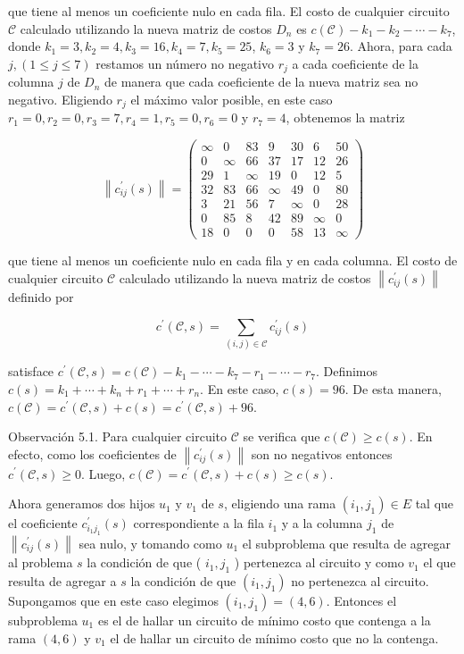 \documentclass[10pt]{article}
\begin{document}
que tiene al menos un coeficiente nulo en cada fila. El costo de cualquier circuito $\mathcal{C}$ calculado utilizando la nueva matriz de costos $D_{n}$ es $c(\mathcal{C})-k_{1}-k_{2}-\cdots-k_{7}$, donde $k_{1}=3, k_{2}=4, k_{3}=16, k_{4}=7, k_{5}=25$, $k_{6}=3$ y $k_{7}=26$. Ahora, para cada $j,(1 \leq j \leq 7)$ restamos un número no negativo $r_{j}$ a cada coeficiente de la columna $j$ de $D_{n}$ de manera que cada coeficiente de la nueva matriz sea no negativo. Eligiendo $r_{j}$ el máximo valor posible, en este caso $r_{1}=0, r_{2}=0, r_{3}=7, r_{4}=1, r_{5}=0, r_{6}=0$ y $r_{7}=4$, obtenemos la matriz

$$
\left\|c_{i j}^{\prime}(s)\right\|=\left(\begin{array}{ccccccc}
\infty & 0 & 83 & 9 & 30 & 6 & 50 \\
0 & \infty & 66 & 37 & 17 & 12 & 26 \\
29 & 1 & \infty & 19 & 0 & 12 & 5 \\
32 & 83 & 66 & \infty & 49 & 0 & 80 \\
3 & 21 & 56 & 7 & \infty & 0 & 28 \\
0 & 85 & 8 & 42 & 89 & \infty & 0 \\
18 & 0 & 0 & 0 & 58 & 13 & \infty
\end{array}\right)
$$

que tiene al menos un coeficiente nulo en cada fila y en cada columna. El costo de cualquier circuito $\mathcal{C}$ calculado utilizando la nueva matriz de costos $\left\|c_{i j}^{\prime}(s)\right\|$ definido por

$$
c^{\prime}(\mathcal{C}, s)=\sum_{(i, j) \in \mathcal{C}} c_{i j}^{\prime}(s)
$$

satisface $c^{\prime}(\mathcal{C}, s)=c(\mathcal{C})-k_{1}-\cdots-k_{7}-r_{1}-\cdots-r_{7}$. Definimos $c(s)=k_{1}+\cdots+k_{n}+r_{1}+\cdots+r_{n}$. En este caso, $c(s)=96$. De esta manera, $c(\mathcal{C})=c^{\prime}(\mathcal{C}, s)+c(s)=c^{\prime}(\mathcal{C}, s)+96$.

Observación 5.1. Para cualquier circuito $\mathcal{C}$ se verifica que $c(\mathcal{C}) \geq c(s)$. En efecto, como los coeficientes de $\left\|c_{i j}^{\prime}(s)\right\|$ son no negativos entonces $c^{\prime}(\mathcal{C}, s) \geq 0$. Luego, $c(\mathcal{C})=c^{\prime}(\mathcal{C}, s)+c(s) \geq c(s)$.

Ahora generamos dos hijos $u_{1}$ y $v_{1}$ de $s$, eligiendo una rama $\left(i_{1}, j_{1}\right) \in E$ tal que el coeficiente $c_{i_{1} j_{1}}^{\prime}(s)$ correspondiente a la fila $i_{1}$ y a la columna $j_{1}$ de $\left\|c_{i j}^{\prime}(s)\right\|$ sea nulo, y tomando como $u_{1}$ el subproblema que resulta de agregar al problema $s$ la condición de que ( $i_{1}, j_{1}$ ) pertenezca al circuito y como $v_{1}$ el que resulta de agregar a $s$ la condición de que $\left(i_{1}, j_{1}\right)$ no pertenezca al circuito. Supongamos que en este caso elegimos $\left(i_{1}, j_{1}\right)=(4,6)$. Entonces el subproblema $u_{1}$ es el de hallar un circuito de mínimo costo que contenga a la rama $(4,6)$ y $v_{1}$ el de hallar un circuito de mínimo costo que no la contenga.
\end{document}
